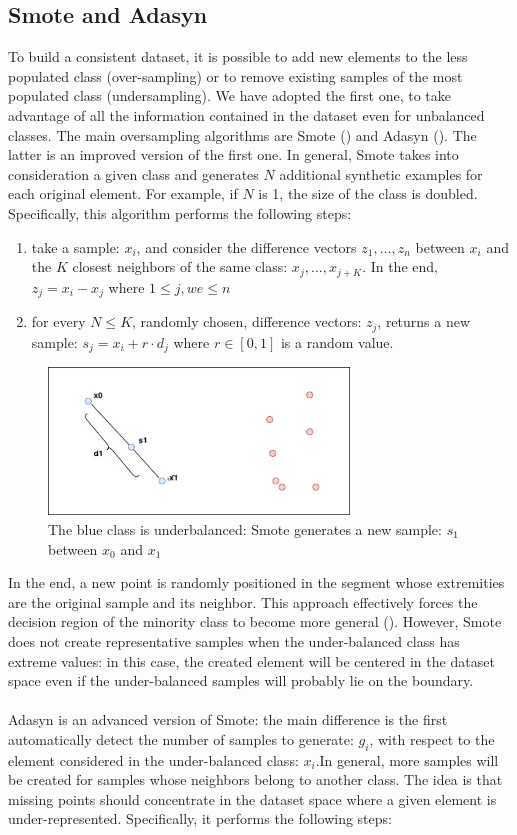 \documentclass[LaM,binding=0.6cm]{sapthesis}
\begin{document}
\subsection{Smote and Adasyn}
To build a consistent dataset, it is possible to add new elements to the less populated class (over-sampling) or to remove existing samples of the most populated class (undersampling). We have adopted the first one, to take advantage of all the information contained in the dataset even for unbalanced classes. The main oversampling algorithms are Smote (\cite{smotepaper}) and Adasyn (\cite{conf/ijcnn/HeBGL08}). The latter is an improved version of the first one. In general, Smote takes into consideration a given class and generates $N$ additional synthetic examples for each original element. For example, if $N$ is 1, the size of the class is doubled. Specifically, this algorithm performs the following steps:
\begin{enumerate}
\item take a sample: $x_i$, and consider the difference vectors $z_1,\dots,z_n$ between $x_i$ and the $K$ closest neighbors of the same class: ${x_j,\dots,x_{j+K}}$. In the end, $z_j = x_i - x_j$  where $1\leq j,we\leq n$
\item for every $N\leq K$, randomly chosen, difference vectors: $z_j$, returns a new sample: $s_j = x_i+r\cdot d_j$ where $r \in [0,1]$ is a random value.
\end{enumerate}
\begin{figure}   \centering
    \includegraphics[width=80mm,scale=0.7]{smoteex.png}
    \caption{The blue class is underbalanced: Smote generates a new sample: $s_1$ between $x_0$ and $x_1$}
    \label{fig:smoteex}
\end{figure}
In the end, a new point is randomly positioned in the segment whose extremities are the original sample and its neighbor. This approach effectively forces the decision region of the minority class to become more general (\cite{smotepaper}). However, Smote does not create representative samples when the under-balanced class has extreme values: in this case, the created element will be centered in the dataset space even if the under-balanced samples will probably lie on the boundary.\\\\Adasyn is an advanced version of Smote: the main difference is the first automatically detect the number of samples to generate: $g_i$, with respect to the element considered in the under-balanced class: $x_i$.In general, more samples will be created for samples whose neighbors belong to another class. The idea is that missing points should concentrate in the dataset space where a given element is under-represented. Specifically, it performs the following steps:
\end{document}
